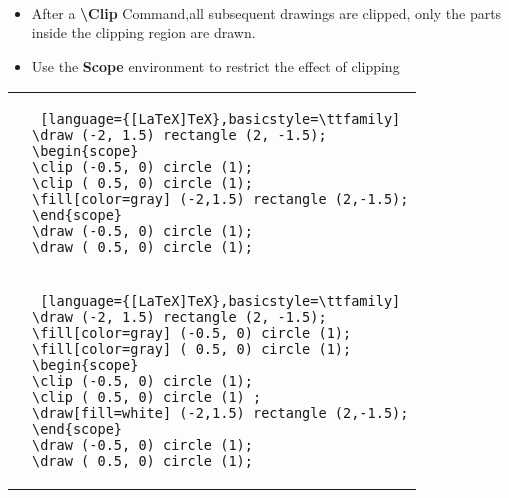 \begin{note}\\

\begin{itemize}
\item After a \textbf{\textbackslash Clip} Command,all subsequent drawings are clipped, only the parts
inside the clipping region are drawn.
\item Use the \textbf{Scope} environment to restrict the effect of clipping
\end{itemize}

\begin{tabular}{c|l}
	\begin{tikzpicture}
	\draw (-2, 1.5) rectangle (2, -1.5);
	\begin{scope}
	\clip (-0.5, 0) circle (1);
	\clip ( 0.5, 0) circle (1);
	\fill[color=gray] (-2,1.5)
	rectangle (2,-1.5);
	\end{scope}
	\draw (-0.5, 0) circle (1);
	\draw ( 0.5, 0) circle (1);
	\end{tikzpicture} &
\begin{lstlisting} [language={[LaTeX]TeX},basicstyle=\ttfamily]
\draw (-2, 1.5) rectangle (2, -1.5);
\begin{scope}
\clip (-0.5, 0) circle (1);
\clip ( 0.5, 0) circle (1);
\fill[color=gray] (-2,1.5) rectangle (2,-1.5);
\end{scope}
\draw (-0.5, 0) circle (1);
\draw ( 0.5, 0) circle (1);
\end{lstlisting} \\
\begin{tikzpicture}
\draw (-2, 1.5) rectangle (2, -1.5);
\fill[color=gray] (-0.5, 0) circle (1);
\fill[color=gray] ( 0.5, 0) circle (1);
\begin{scope}
\clip (-0.5, 0) circle (1);
\clip ( 0.5, 0) circle (1) ;
\draw[fill=white] (-2,1.5)
rectangle (2,-1.5);
\end{scope}
\draw (-0.5, 0) circle (1);
\draw ( 0.5, 0) circle (1);
\end{tikzpicture} &
\begin{lstlisting} [language={[LaTeX]TeX},basicstyle=\ttfamily]
\draw (-2, 1.5) rectangle (2, -1.5);
\fill[color=gray] (-0.5, 0) circle (1);
\fill[color=gray] ( 0.5, 0) circle (1);
\begin{scope}
\clip (-0.5, 0) circle (1);
\clip ( 0.5, 0) circle (1) ;
\draw[fill=white] (-2,1.5) rectangle (2,-1.5);
\end{scope}
\draw (-0.5, 0) circle (1);
\draw ( 0.5, 0) circle (1);
\end{lstlisting} 
\end{tabular}
\end{note}
	
